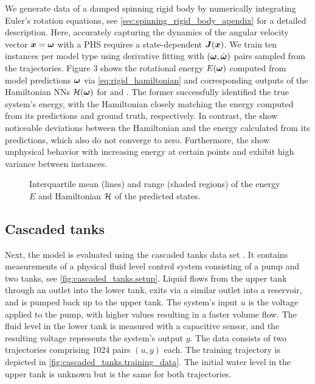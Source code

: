 We generate data of a damped spinning rigid body by numerically integrating Euler's rotation equations, see \cref{sec:spinning_rigid_body_apendix} for a detailed description. 
Here, accurately capturing the dynamics of the angular velocity vector $\boldsymbol{x}=\boldsymbol{\omega}$ with a \gls{PHS} requires a state-dependent \structurematrix $\boldsymbol{J}(\boldsymbol{x})$.
We train ten instances per model type using derivative fitting with $(\boldsymbol{\omega}, \dot{\boldsymbol{\omega}})$ pairs sampled from the trajectories.
Figure 3 shows the rotational energy $E(\boldsymbol{\omega})$ computed from model predictions $\boldsymbol{\omega}$ via \cref{eq:rigid_hamiltonian} and corresponding outputs of the Hamiltonian \glspl{NN} ${\mathcal{H}}(\boldsymbol{\omega})$ for \sPHNNs and \PHNNs. 
The former successfully identified the true system's energy, with the Hamiltonian closely matching the energy computed from its predictions and ground truth, respectively. In contrast, the \PHNNs show noticeable deviations between the Hamiltonian and the energy calculated from its predictions, which also do not converge to zero. Furthermore, the \NODEs show unphysical behavior with increasing energy at certain points and exhibit high variance between instances.

\begin{figure}[h!]
    \centering
    \vspace*{-1mm}
    \vspace*{-1mm}
        \caption{Interquartile mean (lines) and range (shaded regions) of the energy $E$ and Hamiltonian ${\mathcal{H}}$ of the predicted states.}
    \label{fig:spinning_body_errors}
    \vspace{-0.3cm}
\end{figure}

\subsection{Cascaded tanks}\label{sec:cascaded_tanks}

Next, the \sPHNN model is evaluated using the cascaded tanks data set \cite{schoukens2020, schoukens2016}.
It contains measurements of a physical fluid level control system consisting of a pump and two tanks, see \cref{fig:cascaded_tanks.setup}. 
Liquid flows from the upper tank through an outlet into the lower tank, exits via a similar outlet into a reservoir, and is pumped back up to the upper tank. The system's input $u$ is the voltage applied to the pump, with higher values resulting in a faster volume flow. The fluid level in the lower tank is measured with a capacitive sensor, and the resulting voltage represents the system’s output $y$. 
The data consists of two trajectories comprising 1024 pairs $(u, y)$ each. The training trajectory is depicted in \cref{fig:cascaded_tanks.training_data}. The initial water level in the upper tank is unknown but is the same for both trajectories.

